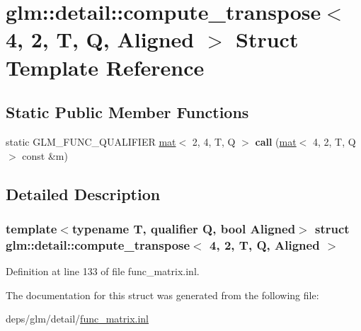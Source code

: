 \hypertarget{structglm_1_1detail_1_1compute__transpose_3_014_00_012_00_01T_00_01Q_00_01Aligned_01_4}{}\section{glm\+:\+:detail\+:\+:compute\+\_\+transpose$<$ 4, 2, T, Q, Aligned $>$ Struct Template Reference}
\label{structglm_1_1detail_1_1compute__transpose_3_014_00_012_00_01T_00_01Q_00_01Aligned_01_4}
\subsection*{Static Public Member Functions}
\begin{DoxyCompactItemize}
\item 
\mbox{\label{structglm_1_1detail_1_1compute__transpose_3_014_00_012_00_01T_00_01Q_00_01Aligned_01_4_a5e13270991a1ebde3bd571f789996db8}} 
static G\+L\+M\+\_\+\+F\+U\+N\+C\+\_\+\+Q\+U\+A\+L\+I\+F\+I\+ER \hyperlink{structglm_1_1mat}{mat}$<$ 2, 4, T, Q $>$ {\bfseries call} (\hyperlink{structglm_1_1mat}{mat}$<$ 4, 2, T, Q $>$ const \&m)
\end{DoxyCompactItemize}


\subsection{Detailed Description}
\subsubsection*{template$<$typename T, qualifier Q, bool Aligned$>$\newline
struct glm\+::detail\+::compute\+\_\+transpose$<$ 4, 2, T, Q, Aligned $>$}



Definition at line 133 of file func\+\_\+matrix.\+inl.



The documentation for this struct was generated from the following file\+:\begin{DoxyCompactItemize}
\item 
deps/glm/detail/\hyperlink{func__matrix_8inl}{func\+\_\+matrix.\+inl}\end{DoxyCompactItemize}
